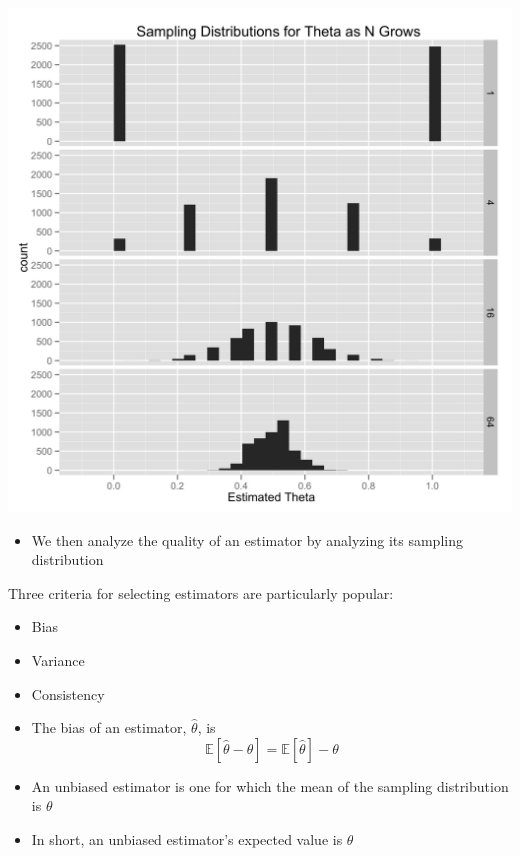 \documentclass{beamer}
\begin{document}
\frame
{
  \begin{center}
    \includegraphics[scale = 0.1]{sampling_distribution.png}
  \end{center}
}

\frame
{
  \begin{itemize}
    \item{We then analyze the quality of an estimator by analyzing its sampling distribution}
  \end{itemize}
}


\frame
{
 Three criteria for selecting estimators are particularly popular:
 \begin{itemize}
   \item{Bias}
   \item{Variance}
   \item{Consistency}
 \end{itemize}
}

\frame
{
  \begin{itemize}
    \item{The bias of an estimator, $\hat{\theta}$, is}
    \[
    \mathbb{E}[\hat{\theta} - \theta] = \mathbb{E}[\hat{\theta}] - \theta
    \]
    \item{An unbiased estimator is one for which the mean of the sampling distribution is $\theta$}
    \item{In short, an unbiased estimator's expected value is $\theta$}
  \end{itemize}
}
\end{document}
